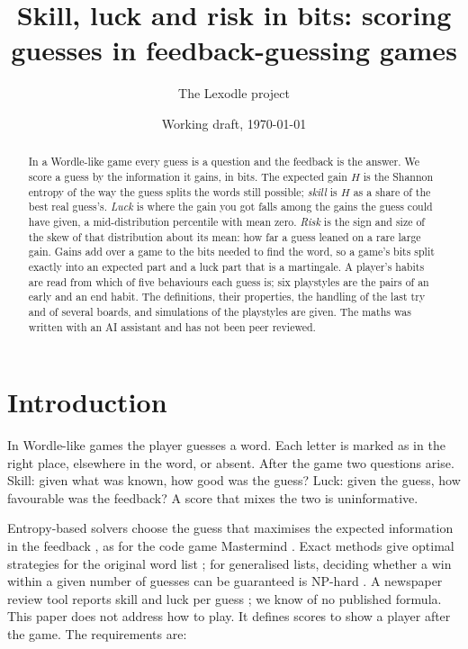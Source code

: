 \documentclass[11pt]{article}
\title{Skill, luck and risk in bits: scoring guesses in feedback-guessing games}
\author{The Lexodle project}
\date{Working draft, \today}
\theoremstyle{definition}
\theoremstyle{remark}
\begin{document}
\maketitle

\begin{abstract}
In a Wordle-like game every guess is a question and the feedback is the answer. We
score a guess by the information it gains, in bits. The expected gain $H$ is the
Shannon entropy of the way the guess splits the words still possible; \emph{skill}
is $H$ as a share of the best real guess's. \emph{Luck} is where the gain you got
falls among the gains the guess could have given, a mid-distribution percentile
with mean zero. \emph{Risk} is the sign and size of the skew of that distribution
about its mean: how far a guess leaned on a rare large gain. Gains add over a game
to the bits needed to find the word, so a game's bits split exactly into an
expected part and a luck part that is a martingale. A player's habits are read from
which of five behaviours each guess is; six playstyles are the pairs of an early and
an end habit. The definitions, their properties, the handling of the last try and of
several boards, and simulations of the playstyles are given. The maths was written
with an AI assistant and has not been peer reviewed.
\end{abstract}

\section{Introduction}

In Wordle-like games the player guesses a word. Each letter is marked as in the
right place, elsewhere in the word, or absent. After the game two questions arise.
Skill: given what was known, how good was the guess? Luck: given the guess, how
favourable was the feedback? A score that mixes the two is uninformative.

Entropy-based solvers choose the guess that maximises the expected information
in the feedback \cite{shannon1948,sanderson2022}, as for the code game
Mastermind \cite{knuth1977,kooi2005}. Exact methods give optimal strategies for the
original word list \cite{bertsimas2022}; for generalised lists, deciding whether a
win within a given number of guesses can be guaranteed is NP-hard
\cite{lokshtanov2022}. A newspaper review tool reports skill and luck per guess
\cite{nyt2022}; we know of no published formula. This paper does not address how to
play. It defines scores to show a player after the game. The requirements are:
\end{document}
